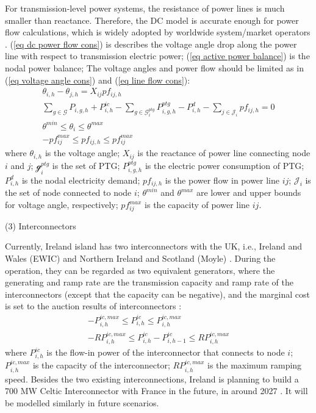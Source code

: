 \documentclass[sn-mathphys,Numbered]{sn-jnl}%
\theoremstyle{thmstyleone}%
\theoremstyle{thmstyletwo}%
\theoremstyle{thmstylethree}%
\begin{document}
For transmission-level power systems, the resistance of power lines is much smaller than reactance. Therefore, the DC model is accurate enough for power flow calculations, which is widely adopted by worldwide system/market operators \cite{stott2009dc}. (\ref{eq dc power flow cons}) is describes the voltage angle drop along the power line with respect to transmission electric power; (\ref{eq active power balance}) is the nodal power balance; The voltage angles and power flow should be limited as in (\ref{eq voltage angle cons}) and (\ref{eq line flow cons}):
\begin{gather}
    \theta_{i,h} - \theta_{j,h} = X_{ij} pf_{ij,h}
\label{eq dc power flow cons}\\
    \sum_{g \in \mathcal{G}}{P_{i,g,h}}
    + P^{ic}_{i,h}
    - \sum_{g \in \mathcal{G}_i^{ptg}}{P_{i,g,h}^{ptg}}
    - P_{i,h}^{d}
    - \sum_{j \in \mathcal{J}_i}{pf_{ij,h}} = 0
\label{eq active power balance} \\
    \theta^{min} \leq \theta_i \leq \theta^{max}
\label{eq voltage angle cons}    \\
 - pf_{ij}^{max} \leq pf_{ij,h} \leq pf_{ij}^{max}
\label{eq line flow cons}
\end{gather}
where $\theta_{i,h}$ is the voltage angle; $X_{ij}$ is the reactance of power line connecting node $i$ and $j$; $\mathcal{g}_i^{ptg}$ is the set of PTG; $P_{i,g,h}^{ptg}$ is the electric power consumption of PTG; $P_{i,h}^{d}$ is the nodal electricity demand; $pf_{ij,h}$ is the power flow in power line $ij$; $\mathcal{J}_i$ is the set of node connected to node $i$; $\theta^{min}$ and $\theta^{max}$ are lower and upper bounds for voltage angle, respectively; $pf_{ij}^{max}$ is the capacity of power line $ij$.

(3) Interconnectors

Currently, Ireland island has two interconnectors with the UK, i.e., Ireland and Wales (EWIC) and Northern Ireland and Scotland (Moyle) \cite{RealTimeSystemInformation}. During the operation, they can be regarded as two equivalent generators, where the generating and ramp rate are the transmission capacity and ramp rate of the interconnectors (except that the capacity can be negative), and the marginal cost is set to the auction results of interconnectors \cite{InterconnectorRequirement}:
\begin{gather}
    - P^{ic,max}_{i,h} \leq P^{ic}_{i,h} \leq P^{ic,max}_{i,h}
\label{eq interconnector capacity}\\
    - RP^{ic,max}_{i,h} \leq P^{ic}_{i,h} - P^{ic}_{i,h-1} \leq RP^{ic,max}_{i,h}
\label{eq interconnector ramp}
\end{gather}
where $P^{ic}_{i,h}$ is the flow-in power of the interconnector that connects to node $i$; $P^{ic,max}_{i,h}$ is the capacity of the interconnector; $RP^{ic,max}_{i,h}$ is the maximum ramping speed.
Besides the two existing interconnections, Ireland is planning to build a 700 MW Celtic Interconnector with France in the future, in around 2027 \cite{CelticInterconnector}. It will be modelled similarly in future scenarios.
\end{document}
